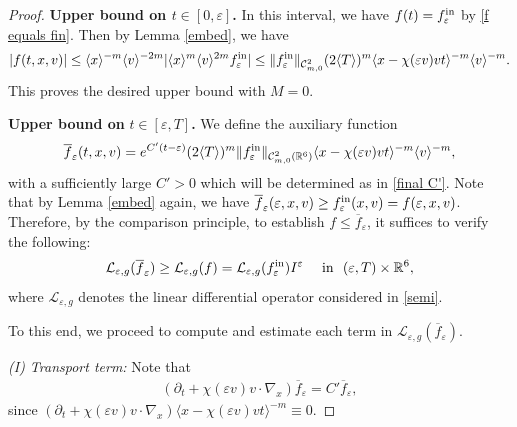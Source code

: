 \documentclass[reqno,11pt,final]{amsart}
\theoremstyle{plain}
\numberwithin{equation}{section}
\numberwithin{theorem}{section}
\begin{document}
\begin{proof}
\textbf{Upper bound on $t\in[0,\varepsilon]$.} In this interval, we have $f(t)=f^\textup{in}_\varepsilon$ by \eqref{f equals fin}. Then by Lemma \ref{embed}, we have 
\begin{align*}
|f(t,x,v)| \le \langle x\rangle^{-m} \langle v\rangle ^{-2m} |\langle x\rangle^m \langle v\rangle ^{2m} f^\textup{in}_\varepsilon|\le \lVert f^\textup{in}_\varepsilon\rVert_{\mathcal{C}^2_{m,0}}(2\langle T\rangle)^m\langle x-\chi(\varepsilon v)vt\rangle^{-m}\langle v\rangle^{-m}.
\end{align*}This proves the desired upper bound with $M=0$.


\noindent\textbf{Upper bound on }$t\in[\varepsilon,T]$\textbf{.} We define the auxiliary function
\begin{align*}
\overline{f}_\varepsilon(t,x,v) = e^{C'(t-\varepsilon)}(2\langle T\rangle)^m\lVert f^\textup{in}_\varepsilon\rVert_{\mathcal{C}^2_{m,0}(\mathbb{R}^6)} \langle x - \chi(\varepsilon v)vt\rangle^{-m}\langle v\rangle^{-m},
\end{align*}with a sufficiently large $C'>0$ which will be determined as in \eqref{final C'}. Note that by Lemma \ref{embed} again, we have $\overline{f}_\varepsilon(\varepsilon,x,v)\ge f^\textup{in}_\varepsilon(x,v)= f(\varepsilon, x,v)$. Therefore, by the comparison principle, to establish $f\le \overline{f}_\varepsilon$, it suffices to verify the following:
\begin{align}\label{4.2 desired ineq}
\mathcal{L}_{\varepsilon,g}(\overline{f}_\varepsilon) \ge \mathcal{L}_{\varepsilon,g}(f)=\mathcal{L}_{\varepsilon,g}(f^\textup{in}_\varepsilon)I^\varepsilon  \quad \textup{ in }\,\, (\varepsilon, T)\times\mathbb{R}^6,
\end{align}where $\mathcal{L}_{\varepsilon,g}$ denotes the linear differential operator considered in \eqref{semi}.

To this end, we proceed to compute and estimate each term in $\mathcal{L}_{\varepsilon,g}(\overline{f}_\varepsilon)$. 

\noindent \textit{(I) Transport term:} Note that
\begin{align}\label{Trans est}
(\partial_t + \chi(\varepsilon v)v\cdot\nabla_x)\overline{f}_\varepsilon = C'\overline{f}_\varepsilon,
\end{align}since $(\partial_t + \chi(\varepsilon v) v\cdot\nabla_x)\langle x-\chi(\varepsilon v)vt\rangle^{-m} \equiv 0$.


\end{proof}
\end{document}
